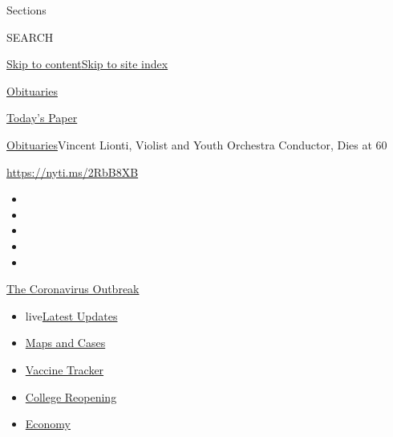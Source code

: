 Sections

SEARCH

\protect\hyperlink{site-content}{Skip to
content}\protect\hyperlink{site-index}{Skip to site index}

\href{https://www.nytimes3xbfgragh.onion/section/obituaries}{Obituaries}

\href{https://myaccount.nytimes3xbfgragh.onion/auth/login?response_type=cookie\&client_id=vi}{}

\href{https://www.nytimes3xbfgragh.onion/section/todayspaper}{Today's
Paper}

\href{/section/obituaries}{Obituaries}\textbar{}Vincent Lionti, Violist
and Youth Orchestra Conductor, Dies at 60

\url{https://nyti.ms/2RbB8XB}

\begin{itemize}
\item
\item
\item
\item
\item
\end{itemize}

\href{https://www.nytimes3xbfgragh.onion/news-event/coronavirus?action=click\&pgtype=Article\&state=default\&region=TOP_BANNER\&context=storylines_menu}{The
Coronavirus Outbreak}

\begin{itemize}
\tightlist
\item
  live\href{https://www.nytimes3xbfgragh.onion/2020/08/04/world/coronavirus-covid-19.html?action=click\&pgtype=Article\&state=default\&region=TOP_BANNER\&context=storylines_menu}{Latest
  Updates}
\item
  \href{https://www.nytimes3xbfgragh.onion/interactive/2020/us/coronavirus-us-cases.html?action=click\&pgtype=Article\&state=default\&region=TOP_BANNER\&context=storylines_menu}{Maps
  and Cases}
\item
  \href{https://www.nytimes3xbfgragh.onion/interactive/2020/science/coronavirus-vaccine-tracker.html?action=click\&pgtype=Article\&state=default\&region=TOP_BANNER\&context=storylines_menu}{Vaccine
  Tracker}
\item
  \href{https://www.nytimes3xbfgragh.onion/2020/08/02/us/covid-college-reopening.html?action=click\&pgtype=Article\&state=default\&region=TOP_BANNER\&context=storylines_menu}{College
  Reopening}
\item
  \href{https://www.nytimes3xbfgragh.onion/live/2020/08/03/business/stock-market-today-coronavirus?action=click\&pgtype=Article\&state=default\&region=TOP_BANNER\&context=storylines_menu}{Economy}
\end{itemize}

